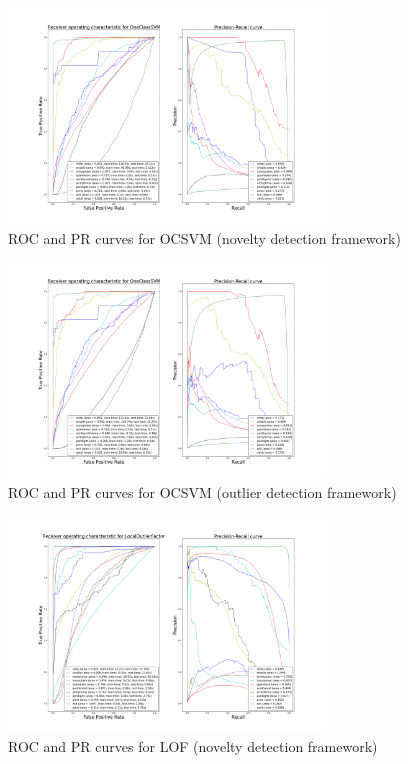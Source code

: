 \begin{figure}[!ht]
    \caption{\acs{ROC} and \acs{PR} curves for \acs{OCSVM} (novelty detection
    framework)}
    \label{ocrf:fig:ocsvm_roc_pr}
    \centering
    \includegraphics[trim=175 80 175 123, clip,
    width=0.75\textwidth]{./gfx/bench_ocsvm_roc_pr_supervised_factorized.png}
\end{figure}
\begin{figure}[!ht]
    \caption{\acs{ROC} and \acs{PR} curves for \acs{OCSVM} (outlier detection
    framework)}
    \label{ocrf:fig:ocsvm_roc_pr_unsupervised}
    \centering
    \includegraphics[trim=175 80 175 123, clip,
    width=0.75\textwidth]{./gfx/bench_ocsvm_roc_pr_unsupervised_factorized.png}
\end{figure}
\begin{figure}[!ht]
    \caption{\acs{ROC} and \acs{PR} curves for \acs{LOF} (novelty detection
    framework)}
    \label{ocrf:fig:lof_roc_pr}
    \centering
    \includegraphics[trim=175 80 175 123, clip,
    width=0.75\textwidth]{./gfx/bench_lof_roc_pr_supervised_factorized.png}
\end{figure}
